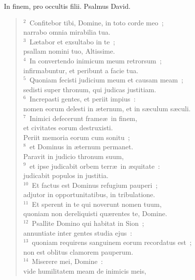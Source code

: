 \bchapter
\lettrine[lines=3,image=true,loversize=0.05,lraise=-0.03]{I}{}n finem, pro occultis filii. Psalmus David.
\begin{flushleft}\begin{verse}\vspace{6pt}${}^{2}$~Confitebor tibi, Domine, in toto corde meo~;\\ narrabo omnia mirabilia tua.\\
${}^{3}$~L\ae tabor et exsultabo in te~;\\ psallam nomini tuo, Altissime.\\
${}^{4}$~In convertendo inimicum meum retrorsum~;\\ infirmabuntur, et peribunt a facie tua.\\
${}^{5}$~Quoniam fecisti judicium meum et causam meam~;\\ sedisti super thronum, qui judicas justitiam.\\
${}^{6}$~Increpasti gentes, et periit impius~:\\ nomen eorum delesti in \ae ternum, et in s\ae culum s\ae culi.\\
${}^{7}$~Inimici defecerunt frame\ae\ in finem,\\ et civitates eorum destruxisti.\\ Periit memoria eorum cum sonitu~;\\
${}^{8}$~et Dominus in \ae ternum permanet.\\ Paravit in judicio thronum suum,\\
${}^{9}$~et ipse judicabit orbem terr\ae\ in \ae quitate~:\\ judicabit populos in justitia.\\
${}^{10}$~Et factus est Dominus refugium pauperi~;\\ adjutor in opportunitatibus, in tribulatione.\\
${}^{11}$~Et sperent in te qui noverunt nomen tuum,\\ quoniam non dereliquisti qu\ae rentes te, Domine.\\
${}^{12}$~Psallite Domino qui habitat in Sion~;\\ annuntiate inter gentes studia ejus~:\\
${}^{13}$~quoniam requirens sanguinem eorum recordatus est~;\\ non est oblitus clamorem pauperum.\\
${}^{14}$~Miserere mei, Domine~:\\ vide humilitatem meam de inimicis meis,\\

\end{verse}
\end{flushleft}
